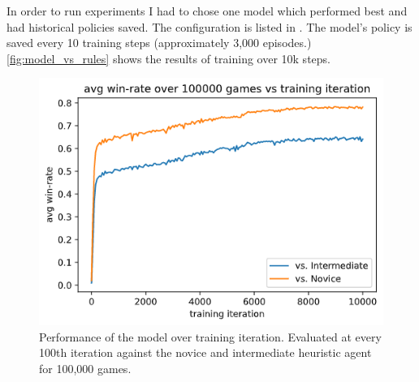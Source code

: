 \documentclass[../main.tex]{subfiles}
\begin{document}
In order to run experiments I had to chose one model which performed best and had historical policies saved. The configuration is listed in . The model's policy is saved every 10 training steps (approximately 3,000 episodes.) \autoref{fig:model_vs_rules} shows the results of training over 10k steps. 

\begin{figure}
    \centering
    \includegraphics[width=\textwidth,keepaspectratio]{images/rules_vs_models.png}
    \caption{Performance of the model over training iteration. Evaluated at every 100th iteration against the novice and intermediate heuristic agent for 100,000 games.}
    \label{fig:model_vs_rules}
\end{figure}


\end{document}
